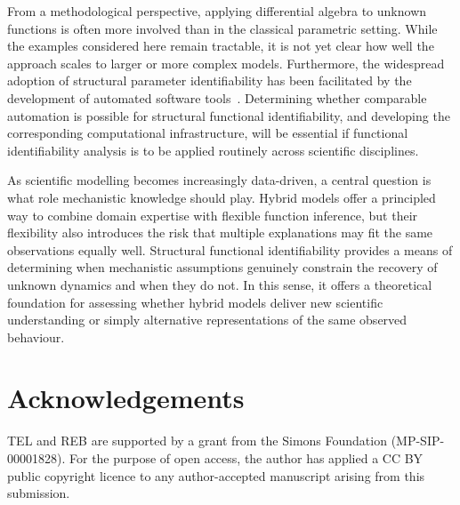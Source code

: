 \documentclass{article}
\theoremstyle{plain}
\theoremstyle{definition}
\begin{document}
{From a methodological perspective, applying differential algebra to unknown functions is often more involved than in the classical parametric setting. While the examples considered here remain tractable, it is not yet clear how well the approach scales to larger or more complex models. Furthermore, the widespread adoption of structural parameter identifiability has been facilitated by the development of automated software tools~\cite{structidjl}. Determining whether comparable automation is possible for structural functional identifiability, and developing the corresponding computational infrastructure, will be essential if functional identifiability analysis is to be applied routinely across scientific disciplines.

As scientific modelling becomes increasingly data-driven, a central question is what role mechanistic knowledge should play. Hybrid models offer a principled way to combine domain expertise with flexible function inference, but their flexibility also introduces the risk that multiple explanations may fit the same observations equally well. Structural functional identifiability provides a means of determining when mechanistic assumptions genuinely constrain the recovery of unknown dynamics and when they do not. In this sense, it offers a theoretical foundation for assessing whether hybrid models deliver new scientific understanding or simply alternative representations of the same observed behaviour.


\section*{Acknowledgements}

TEL and REB are supported by a grant from the Simons Foundation (MP-SIP-00001828). For the purpose of open access, the author has applied a CC BY public copyright licence to any author-accepted manuscript arising from this submission.


}
\end{document}
